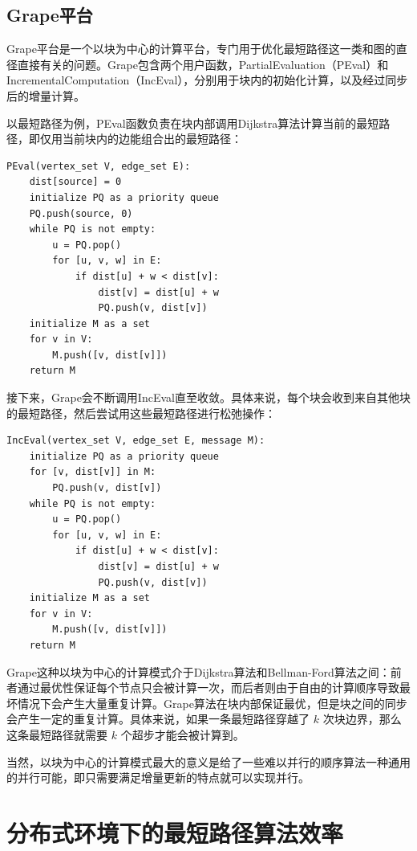 \vspace{-1em}
\subsection{Grape平台}

Grape平台是一个以块为中心的计算平台，专门用于优化最短路径这一类和图的直径直接有关的问题。Grape包含两个用户函数，PartialEvaluation（PEval）和IncrementalComputation（IncEval），分别用于块内的初始化计算，以及经过同步后的增量计算。

以最短路径为例，PEval函数负责在块内部调用Dijkstra算法计算当前的最短路径，即仅用当前块内的边能组合出的最短路径：
\begin{lstlisting}
PEval(vertex_set V, edge_set E):
    dist[source] = 0
    initialize PQ as a priority queue
    PQ.push(source, 0)
    while PQ is not empty:
        u = PQ.pop()
        for [u, v, w] in E:
            if dist[u] + w < dist[v]:
                dist[v] = dist[u] + w
                PQ.push(v, dist[v])
    initialize M as a set
    for v in V:
        M.push([v, dist[v]])
    return M
\end{lstlisting}

接下来，Grape会不断调用IncEval直至收敛。具体来说，每个块会收到来自其他块的最短路径，然后尝试用这些最短路径进行松弛操作：
\begin{lstlisting}
IncEval(vertex_set V, edge_set E, message M):
    initialize PQ as a priority queue
    for [v, dist[v]] in M:
        PQ.push(v, dist[v])
    while PQ is not empty:
        u = PQ.pop()
        for [u, v, w] in E:
            if dist[u] + w < dist[v]:
                dist[v] = dist[u] + w
                PQ.push(v, dist[v])
    initialize M as a set
    for v in V:
        M.push([v, dist[v]])
    return M
\end{lstlisting}

Grape这种以块为中心的计算模式介于Dijkstra算法和Bellman-Ford算法之间：前者通过最优性保证每个节点只会被计算一次，而后者则由于自由的计算顺序导致最坏情况下会产生大量重复计算。Grape算法在块内部保证最优，但是块之间的同步会产生一定的重复计算。具体来说，如果一条最短路径穿越了 $k$ 次块边界，那么这条最短路径就需要 $k$ 个超步才能会被计算到。

当然，以块为中心的计算模式最大的意义是给了一些难以并行的顺序算法一种通用的并行可能，即只需要满足增量更新的特点就可以实现并行。



\section{分布式环境下的最短路径算法效率}
\label{sec:distribution2}

